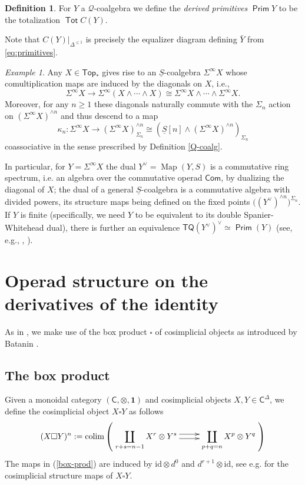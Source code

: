 \documentclass[12pt]{amsart}
\theoremstyle{definition}
\newtheorem{definition}[subsection]{Definition}
\theoremstyle{remark}
\newtheorem{example}[subsection]{Example}
\newcommand{\Top}{\mathsf{Top}_*}
\newcommand{\TQ}{\mathsf{TQ}}
\newcommand{\Sp}{\Sigma^{\infty}}
\newcommand{\Tot}{\operatorname{\mathsf{Tot}}}
\newcommand{\Map}{\operatorname{Map}}
\newcommand{\colim}{\operatorname{colim}}
\newcommand{\id}{\mathrm{id}}
\newcommand{\Cal}[1]{\mathcal{#1}}
\newcommand{\uS}{\underline{S}}
\newcommand{\Prim}{\operatorname{\mathsf{Prim}}}
\begin{document}
\begin{definition} \label{def:derived-prim} For $Y$ a $\Cal{Q}$-coalgebra we define the \textit{derived primitives} $\Prim Y$ to be the totalization $\Tot C(Y)$. 
\end{definition}

Note that $C(Y)|_{\Delta^{\leq 1}}$ is precisely the equalizer diagram defining $\bar{Y}$ from \eqref{eq:primitives}.

\begin{example} \label{ex:SW-TQ}
    Any $X\in \Top$ gives rise to an $\uS$-coalgebra $\Sp X$ whose comultiplication maps are induced by the diagonals on $X$, i.e., \[\Sp X\to \Sp (X\wedge \cdots \wedge X)\cong \Sp X\wedge \cdots \wedge \Sp X.\]
    Moreover, for any $n\geq 1$ these diagonals naturally commute with the $\Sigma_n$ action on $(\Sp X)^{\wedge n}$ and thus descend to a map \[\kappa_n\colon \Sp X\to (\Sp X)^{\wedge n}_{\Sigma_n} \cong (\uS[n]\wedge (\Sp X)^{\wedge n} )_{\Sigma_n} \]
    coassociative in the sense prescribed by Definition \ref{Q-coalg}.

    In particular, for $Y = \Sp X$ the dual $Y^{\vee}=\Map(Y,S)$ is a commutative ring spectrum, i.e. an algebra over the commutative operad $\mathsf{Com}$, by dualizing the diagonal of $X$; the dual of a general $\uS$-coalgebra is a commutative algebra with divided powers, its structure maps being defined on the fixed points $\big((Y^{\vee})^{\wedge n}\big)^{\Sigma_n}$. If $Y$ is finite (specifically, we need $Y$ to be equivalent to its double Spanier-Whitehead dual), there is further an equivalence  $\TQ(Y^{\vee})^{\vee}\simeq \Prim (Y)$ (see, e.g., \cite{BR}, \cite{Heuts-vn}).
    \end{example}



\section{Operad structure on the derivatives of the identity}
As in \cite{Clark-1}, we make use of the box product $\square$ of cosimplicial objects as introduced by Batanin \cite{Bat-box}. 


\subsection{The box product} \label{sec:box-prod} Given a monoidal category $(\mathsf{C},\otimes, \mathbf{1})$ and cosimplicial objects $X,Y\in \mathsf{C}^{\Delta}$, we define the cosimplicial object $X\square Y$ as follows   \begin{equation} \label{box-prod}
    (X\square Y)^{n} := \colim \left(\xymatrix{ \displaystyle{\coprod_{r+s=n-1} X^r \otimes Y^s} \ar@<.75ex>[r] \ar@<-.5ex>[r] & \displaystyle{\coprod_{p+q=n} X^p \otimes Y^q}}\right)
\end{equation} 
The maps in (\ref{box-prod}) are induced by $\id \otimes d^0$ and $d^{r+1}\otimes \id$, see e.g. \cite[Definition 4.13]{Ching-Harper-Koszul} for the cosimplicial structure maps of $X\square Y$.  
\end{document}
